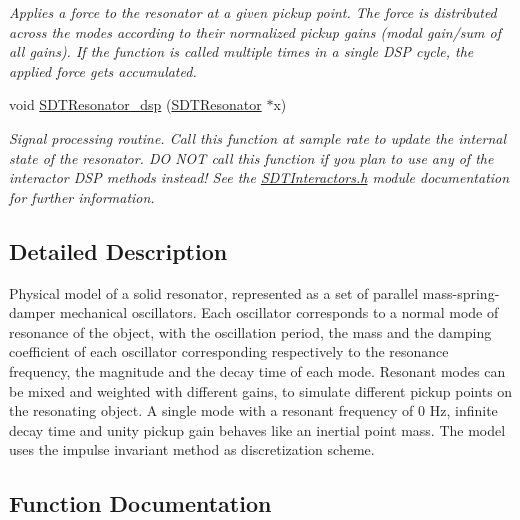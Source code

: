 \begin{DoxyCompactItemize}
\begin{DoxyCompactList}\small\item\em Applies a force to the resonator at a given pickup point. The force is distributed across the modes according to their normalized pickup gains (modal gain/sum of all gains). If the function is called multiple times in a single D\+S\+P cycle, the applied force gets accumulated. \end{DoxyCompactList}\item 
\hypertarget{group__resonators_ga5aff90f4cf699af25c1b30b81a05f693}{}void \hyperlink{group__resonators_ga5aff90f4cf699af25c1b30b81a05f693}{S\+D\+T\+Resonator\+\_\+dsp} (\hyperlink{group__resonators_ga07d183de45e9713277c8f62d93d9be9c}{S\+D\+T\+Resonator} $\ast$x)\label{group__resonators_ga5aff90f4cf699af25c1b30b81a05f693}

\begin{DoxyCompactList}\small\item\em Signal processing routine. Call this function at sample rate to update the internal state of the resonator. D\+O N\+O\+T call this function if you plan to use any of the interactor D\+S\+P methods instead! See the \hyperlink{_s_d_t_interactors_8h}{S\+D\+T\+Interactors.\+h} module documentation for further information. \end{DoxyCompactList}\end{DoxyCompactItemize}


\subsection{Detailed Description}
Physical model of a solid resonator, represented as a set of parallel mass-\/spring-\/damper mechanical oscillators. Each oscillator corresponds to a normal mode of resonance of the object, with the oscillation period, the mass and the damping coefficient of each oscillator corresponding respectively to the resonance frequency, the magnitude and the decay time of each mode. Resonant modes can be mixed and weighted with different gains, to simulate different pickup points on the resonating object. A single mode with a resonant frequency of 0 Hz, infinite decay time and unity pickup gain behaves like an inertial point mass. The model uses the impulse invariant method as discretization scheme. 

\subsection{Function Documentation}
\hypertarget{group__resonators_ga9d63332360ee72a9bbcb1dcd85d877a5}{}
